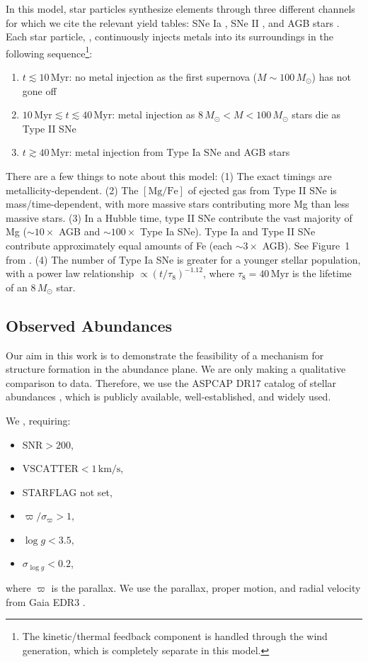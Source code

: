 \documentclass[twocolumn,linenumbers,trackchanges]{aastex631}
\newcommand{\Msun}{\ensuremath{M_{\odot}}}
\newcommand{\Myr}{\ensuremath{\textrm{Myr}}}
\newcommand{\kms}{\ensuremath{\textrm{km}/\textrm{s}}}
\newcommand{\MgFe}{\ensuremath{[\textrm{Mg}/\textrm{Fe}]}}
\begin{document}
In this model, star particles synthesize elements through three different channels for which we cite the relevant yield tables: SNe Ia \citep{1997NuPhA.621..467N}, SNe II \citep{1998A&A...334..505P,2006ApJ...653.1145K}, and AGB stars \citep{2010MNRAS.403.1413K,2014MNRAS.437..195D,2014ApJ...797...44F}. Each star particle, , continuously injects metals into its surroundings in the following sequence\footnote{The kinetic/thermal feedback component is handled through the wind generation, which is completely separate in this model.}:
\begin{enumerate}
    \item $t\lesssim10\,\Myr$: no metal injection as the first supernova ($M\sim100\,\Msun$) has not gone off
    \item $10\,\Myr \lesssim t \lesssim 40\,\Myr$: metal injection as $8\,\Msun<M<100\,\Msun$ stars die as Type II SNe
    \item $t\gtrsim40\,\Myr$: metal injection from Type Ia SNe and AGB stars
\end{enumerate}
There are a few things to note about this model: (1) The exact timings are metallicity-dependent. (2) The \MgFe{} of ejected gas from Type II SNe is mass/time-dependent, with more massive stars contributing more Mg than less massive stars. (3) In a Hubble time, type II SNe contribute the vast majority of Mg ($\sim10\times$ AGB and $\sim100\times$ Type Ia SNe). Type Ia and Type II SNe contribute approximately equal amounts of Fe (each $\sim3\times$ AGB). See Figure~1 from \citet{2018MNRAS.473.4077P}. (4) The number of Type Ia SNe is greater for a younger stellar population, with a power law relationship $\propto \left(t/\tau_8\right)^{-1.12}$, where $\tau_8=40\,\Myr$ is the lifetime of an $8\,\Msun$ star.

\subsection{Observed Abundances}\label{ssec:obs_abund}
Our aim in this work is to demonstrate the feasibility of a mechanism for structure formation in the abundance plane. We are only making a qualitative comparison to data. Therefore, we use the ASPCAP DR17 catalog of stellar abundances \citep[][J.A.~Holtzman et al., in preparation]{2016AJ....151..144G}, which is publicly available, well-established, and widely used.

We , requiring:
\begin{itemize}[noitemsep]
    \item $\textrm{SNR} > 200$,
    \item $\textrm{VSCATTER} < 1\,\kms$,
    \item STARFLAG not set,
    \item $\varpi/\sigma_{\varpi} > 1$,
    \item $\log{g} < 3.5$,
    \item $\sigma_{\log{g}} < 0.2$,
\end{itemize}
where $\varpi$ is the parallax. We use the parallax, proper motion, and radial velocity from Gaia EDR3 \citep{2016AA...595A...1G,2021AA...649A...1G,2021AA...649A...2L,2021AA...653A.160S}.
\end{document}
